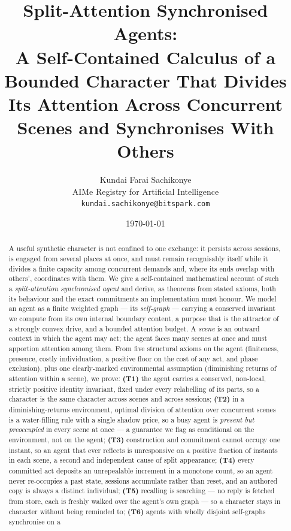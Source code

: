 \documentclass[11pt,twocolumn,a4paper]{article}
\title{\textbf{Split-Attention Synchronised Agents:\\
A Self-Contained Calculus of a Bounded Character That Divides Its
Attention Across Concurrent Scenes and Synchronises With Others}}
\author{Kundai Farai Sachikonye\\[2pt]
\small AIMe Registry for Artificial Intelligence\\
\small \texttt{kundai.sachikonye@bitspark.com}}
\date{\today}
\begin{document}
\maketitle

\begin{abstract}
\noindent
A useful synthetic character is not confined to one exchange: it persists
across sessions, is engaged from several places at once, and must remain
recognisably itself while it divides a finite capacity among concurrent
demands and, where its ends overlap with others', coordinates with them.
We give a self-contained mathematical account of such a
\emph{split-attention synchronised agent} and derive, as theorems from
stated axioms, both its behaviour and the exact commitments an
implementation must honour. We model an agent as a finite weighted graph
--- its \emph{self-graph} --- carrying a conserved invariant we compute
from its own internal boundary content, a purpose that is the attractor
of a strongly convex drive, and a bounded attention budget. A
\emph{scene} is an outward context in which the agent may act; the agent
faces many scenes at once and must apportion attention among them. From
five structural axioms on the agent (finiteness, presence, costly
individuation, a positive floor on the cost of any act, and phase
exclusion), plus one clearly-marked environmental assumption
(diminishing returns of attention within a scene), we prove:
\textbf{(T1)} the agent carries a conserved, non-local, strictly positive
identity invariant, fixed under every relabelling of its parts, so a
character is the same character across scenes and across sessions;
\textbf{(T2)} in a diminishing-returns environment, optimal division of
attention over concurrent scenes is a water-filling rule with a single
shadow price, so a busy agent is \emph{present but preoccupied} in every
scene at once --- a guarantee we flag as conditional on the environment, not
on the agent;
\textbf{(T3)} construction and commitment cannot occupy one instant, so
an agent that ever reflects is unresponsive on a positive fraction of
instants in each scene, a second and independent cause of split
appearance;
\textbf{(T4)} every committed act deposits an unrepealable increment in a
monotone count, so an agent never re-occupies a past state, sessions
accumulate rather than reset, and an authored copy is always a distinct
individual;
\textbf{(T5)} recalling is searching --- no reply is fetched from store,
each is freshly walked over the agent's own graph --- so a character stays
in character without being reminded to;
\textbf{(T6)} agents with wholly disjoint self-graphs synchronise on a

\end{abstract}
\end{document}
